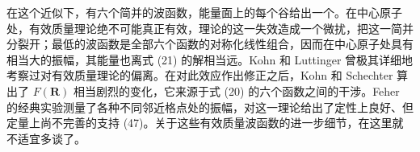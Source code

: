 在这个近似下，有六个简并的波函数，能量面上的每个谷给出一个。在中心原子处，有效质量理论绝不可能真正有效，理论的这一失效造成一个微扰，把这一简并分裂开；最低的波函数是全部六个函数的对称化线性组合，因而在中心原子处具有相当大的振幅，其能量也离式 (21) 的解相当远。Kohn 和 Luttinger 曾极其详细地考察过对有效质量理论的偏离。在对此效应作出修正之后，Kohn 和 Schechter 算出了 $F(\mathbf{R})$ 相当剧烈的变化，它来源于式 (20) 的六个函数之间的干涉。Feher 的经典实验测量了各种不同邻近格点处的振幅，对这一理论给出了定性上良好、但定量上尚不完善的支持 (47)。关于这些有效质量波函数的进一步细节，在这里就不适宜多谈了。
